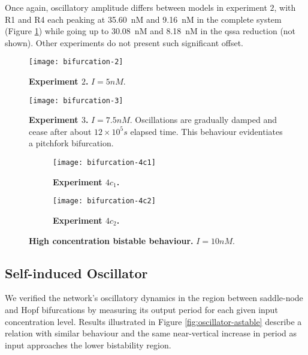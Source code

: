     Once again, oscillatory amplitude differs between models in experiment $2$, with R1 and R4 each peaking at \SI{35.60}{\nano M} and \SI{9.16}{\nano M} in the complete system (Figure \ref{fig:bifurcation-2}) while going up to \SI{30.08}{\nano M} and \SI{8.18}{\nano M} in the \ac{qssa} reduction (not shown).
    Other experiments do not present such significant offset.

    \begin{figure}[!htbp]
      \centering
      \texttt{[image: bifurcation-2]}
      \caption{\textbf{Experiment $2$.} $I = 5 nM$.}
      \label{fig:bifurcation-2}
    \end{figure}

    \begin{figure}[!htbp]
      \centering
      \texttt{[image: bifurcation-3]}
      \caption{\textbf{Experiment $3$.} $I = 7.5nM$. Oscillations are gradually damped and cease after about $12 \times 10^5 s$ elapsed time. This behaviour evidentiates a pitchfork bifurcation.}
      \label{fig:bifurcation-3}
    \end{figure}

    \begin{figure}[!htb]
      \centering
      \begin{subfigure}[t]{0.7\textwidth}
        \centering
        \texttt{[image: bifurcation-4c1]}
        \caption{\textbf{Experiment $4c_{1}$.}}
        \label{fig:bifurcation-4c1}
      \end{subfigure}
      \begin{subfigure}[t]{0.7\textwidth}
        \centering
        \texttt{[image: bifurcation-4c2]}
        \caption{\textbf{Experiment $4c_{2}$.}}
        \label{fig:bifurcation-4c2}
      \end{subfigure}
      \caption{\textbf{High concentration bistable behaviour.} $I = 10 nM$.}
      \label{fig:bifurcation-4}
    \end{figure}


  \subsection{Self-induced Oscillator}

    We verified the network's oscillatory dynamics in the region between saddle-node and Hopf bifurcations by measuring its output period for each given input concentration level.
    Results illustrated in Figure \ref{fig:oscillator-astable} describe a relation with similar behaviour and the same near-vertical increase in period as input approaches the lower bistability region. %

